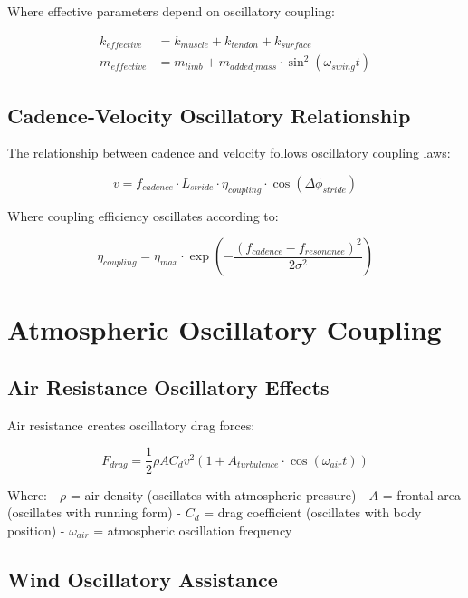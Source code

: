 \documentclass[12pt]{article}
\begin{document}
Where effective parameters depend on oscillatory coupling:

\begin{align}
k_{effective} &= k_{muscle} + k_{tendon} + k_{surface} \\
m_{effective} &= m_{limb} + m_{added\_mass} \cdot \sin^2(\omega_{swing}t)
\end{align}

\subsection{Cadence-Velocity Oscillatory Relationship}

The relationship between cadence and velocity follows oscillatory coupling laws:

\begin{equation}
v = f_{cadence} \cdot L_{stride} \cdot \eta_{coupling} \cdot \cos(\Delta\phi_{stride})
\end{equation}

Where coupling efficiency oscillates according to:

\begin{equation}
\eta_{coupling} = \eta_{max} \cdot \exp\left(-\frac{(f_{cadence} - f_{resonance})^2}{2\sigma^2}\right)
\end{equation}

\section{Atmospheric Oscillatory Coupling}

\subsection{Air Resistance Oscillatory Effects}

Air resistance creates oscillatory drag forces:

\begin{equation}
F_{drag} = \frac{1}{2}\rho A C_d v^2 \left(1 + A_{turbulence} \cdot \cos(\omega_{air}t)\right)
\end{equation}

Where:
- $\rho$ = air density (oscillates with atmospheric pressure)
- $A$ = frontal area (oscillates with running form)  
- $C_d$ = drag coefficient (oscillates with body position)
- $\omega_{air}$ = atmospheric oscillation frequency

\subsection{Wind Oscillatory Assistance}
\end{document}

